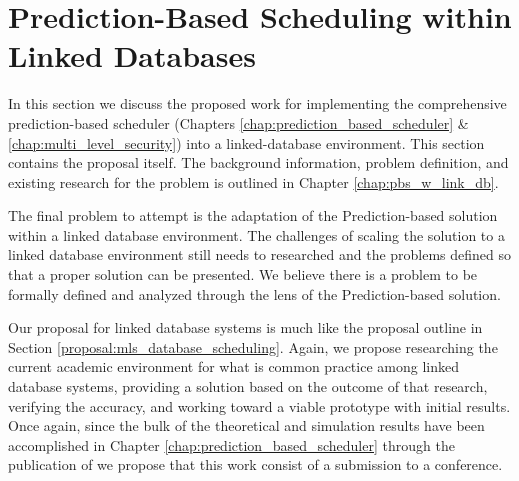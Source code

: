 \section{Prediction-Based Scheduling within Linked Databases}
\label{diss:linked_databases}

In this section we discuss the proposed work for implementing the comprehensive prediction-based scheduler (Chapters \ref{chap:prediction_based_scheduler} \& \ref{chap:multi_level_security}) into a linked-database environment. This section contains the proposal itself. The background information, problem definition, and existing research for the problem is outlined in Chapter \ref{chap:pbs_w_link_db}.

The final problem to attempt is the adaptation of the Prediction-based solution within a linked database environment. The challenges of scaling the solution to a linked database environment still needs to researched and the problems defined so that a proper solution can be presented. We believe there is a problem to be formally defined and analyzed through the lens of the Prediction-based solution.

Our proposal for linked database systems is much like the proposal outline in Section \ref{proposal:mls_database_scheduling}. Again, we propose researching the current academic environment for what is common practice among linked database systems, providing a solution based on the outcome of that research, verifying the accuracy, and working toward a viable prototype with initial results. Once again, since the bulk of the theoretical and simulation results have been accomplished in Chapter \ref{chap:prediction_based_scheduler} through the publication of \cite{ravan_ensuring_2020} we propose that this work consist of a submission to a conference.